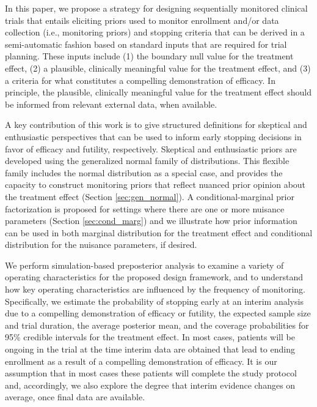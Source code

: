 \documentclass[useAMS,usenatbib,referee]{biom}
\begin{document}
In this paper, we propose a strategy for designing sequentially monitored clinical trials that entails eliciting 
priors used to monitor enrollment and/or data collection (i.e., monitoring priors) and stopping criteria that can 
be derived in a semi-automatic fashion based on standard inputs that are required for trial planning. 
%
These inputs include (1) the boundary null value for the treatment effect, (2) a plausible, clinically meaningful 
value for the treatment effect, and (3) a criteria for what constitutes a compelling demonstration of efficacy. 
%
In principle, the plausible, clinically meaningful value for the treatment effect should be informed from relevant external data, when available. 


A key contribution of this work is to give structured definitions for skeptical and enthusiastic perspectives that can be used 
to inform early stopping decisions in favor of efficacy and futility, respectively. Skeptical and enthusiastic priors are developed using the generalized normal family of distributions. 
This flexible family includes the normal distribution as a special case, and provides the capacity to construct monitoring 
priors that reflect nuanced prior opinion about the treatment effect (Section \ref{sec:gen_normal}). 
A conditional-marginal prior factorization is proposed for settings where there are one or more nuisance 
parameters (Section \ref{sec:cond_marg}) and we illustrate how prior information can be used in both marginal 
distribution for the treatment effect and conditional distribution for the nuisance parameters, if desired. 

We perform simulation-based preposterior analysis to examine a variety of operating characteristics for the proposed design framework,
and to understand how key operating characteristics are influenced by the frequency of monitoring.
Specifically, we estimate the probability of stopping early at an interim analysis due to a compelling demonstration of efficacy or futility, the expected sample size and trial duration, the average posterior mean, and the coverage probabilities for 95\% credible intervals for the treatment effect. 
In most cases, patients will be ongoing in the trial at the time interim data are obtained that lead to 
ending enrollment as a result of a compelling demonstration of efficacy. 
It is our assumption that in most cases these patients will complete the study protocol and, accordingly, we also explore 
the degree that interim evidence changes on average, once final data are available.	
\end{document}
